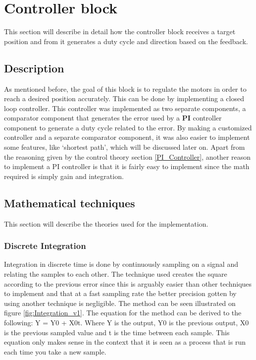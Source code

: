 \section{Controller block}
This section will describe in detail how the controller block receives a target position and from it generates a duty cycle and direction based on the feedback.

\subsection{Description}

As mentioned before, the goal of this block is to regulate the motors in order to reach a desired position accurately. This can be done by implementing a closed loop controller. This controller was implemented as two separate components, a comparator component that generates the error used by a \textbf{PI} controller component to generate a duty cycle related to the error. By making a customized controller and a separate comparator component, it was also easier to implement some features, like ‘shortest path’, which will be discussed later on. 
Apart from the reasoning given by the control theory section \ref{PI_Controller}, another reason to implement a PI controller is that it is fairly easy to implement since the math required is simply gain and integration.


\subsection{Mathematical techniques}

This section will describe the theories used for the implementation.


\subsubsection{Discrete Integration}

Integration in discrete time is done by continuously sampling on a signal and relating the samples to each other. The technique used creates the square according to the previous error since this is arguably easier than other techniques to implement and that at a fast sampling rate the better precision gotten by using another technique is negligible. The method can be seen illustrated on figure \ref{fig:Integration_v1}.
The equation for the method can be derived to the following: Y = Y0 + X0t. Where Y is the output, Y0 is the previous output, X0 is the previous sampled value and t is the time between each sample. This equation only makes sense in the context that it is seen as a process that is run each time you take a new sample.


